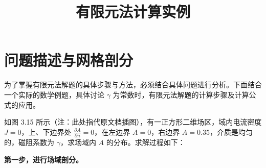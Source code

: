 \documentclass[a4paper, 12pt]{article}
\title{有限元法计算实例}
\author{}
\date{}
\begin{document}
\maketitle

\section{问题描述与网格剖分}

为了掌握有限元法解题的具体步骤与方法，必须结合具体问题进行分析。下面结合一个实际的数学例题，具体讨论 $\gamma$ 为常数时，有限元法解题的计算步骤及计算公式的应用。

如图 3.15 所示（注：此处指代原文档插图），有一正方形二维场区，域内电流密度 $J=0$，上、下边界处 $\frac{\partial A}{\partial n} = 0$，在左边界 $A=0$，右边界 $A=0.35$，介质是均匀的，磁阻系数为 $\gamma$，求场域内 $A$ 的分布。求解过程如下：

\textbf{第一步，进行场域剖分。}
\end{document}
